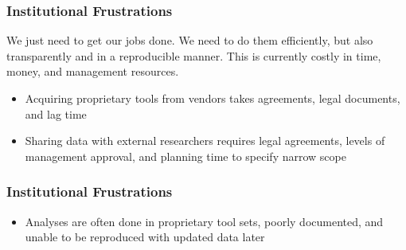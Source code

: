 \documentclass{beamer}
\begin{document}
\begin{frame}
\frametitle{Institutional Frustrations}
We just need to get our jobs done. We need to do them efficiently, but also transparently and in a reproducible manner. This is currently costly in time, money, and management resources.
  \begin{itemize}
  \item Acquiring proprietary tools from vendors takes agreements, legal documents, and lag time
  \pause
  \item Sharing data with external researchers requires legal agreements, levels of management approval, and planning time to specify narrow scope
  \end {itemize}
\end{frame}

{
\begin{frame}[plain]
\end{frame}
}

\begin{frame}
\frametitle{Institutional Frustrations}
  \begin{itemize}
  \item Analyses are often done in proprietary tool sets, poorly documented, and unable to be reproduced with updated data later
  \end {itemize}
\end{frame}
\end{document}
